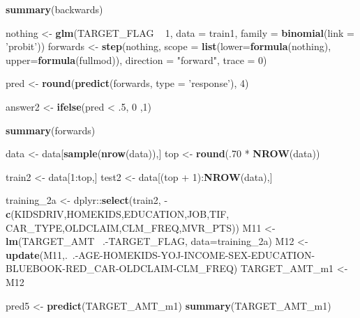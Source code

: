 \documentclass[]{article}
\newenvironment{Shaded}{\begin{snugshade}}{\end{snugshade}}
\newcommand{\KeywordTok}[1]{\textcolor[rgb]{0.13,0.29,0.53}{\textbf{{#1}}}}
\newcommand{\DataTypeTok}[1]{\textcolor[rgb]{0.13,0.29,0.53}{{#1}}}
\newcommand{\DecValTok}[1]{\textcolor[rgb]{0.00,0.00,0.81}{{#1}}}
\newcommand{\StringTok}[1]{\textcolor[rgb]{0.31,0.60,0.02}{{#1}}}
\newcommand{\NormalTok}[1]{{#1}}
\begin{document}
\begin{Shaded}
\begin{Highlighting}[]
{{{{\KeywordTok{summary}\NormalTok{(backwards)}

\NormalTok{nothing <-}\StringTok{ }\KeywordTok{glm}\NormalTok{(TARGET_FLAG ~}\StringTok{ }\DecValTok{1}\NormalTok{, }\DataTypeTok{data =} \NormalTok{train1, }\DataTypeTok{family =} \KeywordTok{binomial}\NormalTok{(}\DataTypeTok{link =} \StringTok{'probit'}\NormalTok{))}
\NormalTok{forwards <-}\StringTok{ }\KeywordTok{step}\NormalTok{(nothing, }\DataTypeTok{scope =} \KeywordTok{list}\NormalTok{(}\DataTypeTok{lower=}\KeywordTok{formula}\NormalTok{(nothing), }\DataTypeTok{upper=}\KeywordTok{formula}\NormalTok{(fullmod)), }\DataTypeTok{direction =} \StringTok{"forward"}\NormalTok{, }\DataTypeTok{trace =} \DecValTok{0}\NormalTok{)}

\NormalTok{pred <-}\StringTok{ }\KeywordTok{round}\NormalTok{(}\KeywordTok{predict}\NormalTok{(forwards, }\DataTypeTok{type =} \StringTok{'response'}\NormalTok{), }\DecValTok{4}\NormalTok{)}

\NormalTok{answer2 <-}\StringTok{ }\KeywordTok{ifelse}\NormalTok{(pred <}\StringTok{ }\NormalTok{.}\DecValTok{5}\NormalTok{, }\DecValTok{0} \NormalTok{,}\DecValTok{1}\NormalTok{)}

\KeywordTok{summary}\NormalTok{(forwards)}

\NormalTok{data <-}\StringTok{ }\NormalTok{data[}\KeywordTok{sample}\NormalTok{(}\KeywordTok{nrow}\NormalTok{(data)),]}
\NormalTok{top <-}\StringTok{ }\KeywordTok{round}\NormalTok{(.}\DecValTok{70} \NormalTok{*}\StringTok{ }\KeywordTok{NROW}\NormalTok{(data))}

\NormalTok{train2 <-}\StringTok{ }\NormalTok{data[}\DecValTok{1}\NormalTok{:top,]}
\NormalTok{test2 <-}\StringTok{ }\NormalTok{data[(top +}\StringTok{ }\DecValTok{1}\NormalTok{):}\KeywordTok{NROW}\NormalTok{(data),]}

\NormalTok{training_2a <-}\StringTok{ }\NormalTok{dplyr::}\KeywordTok{select}\NormalTok{(train2, -}\KeywordTok{c}\NormalTok{(KIDSDRIV,HOMEKIDS,EDUCATION,JOB,TIF,}
                                     \NormalTok{CAR_TYPE,OLDCLAIM,CLM_FREQ,MVR_PTS))}
\NormalTok{M11 <-}\StringTok{ }\KeywordTok{lm}\NormalTok{(TARGET_AMT~}\StringTok{ }\NormalTok{.-TARGET_FLAG, }\DataTypeTok{data=}\NormalTok{training_2a)}
\NormalTok{M12 <-}\StringTok{ }\KeywordTok{update}\NormalTok{(M11,.~.-AGE-HOMEKIDS-YOJ-INCOME-SEX-EDUCATION-BLUEBOOK-RED_CAR-OLDCLAIM-CLM_FREQ)}
\NormalTok{TARGET_AMT_m1 <-}\StringTok{ }\NormalTok{M12}

\NormalTok{pred5 <-}\StringTok{ }\KeywordTok{predict}\NormalTok{(TARGET_AMT_m1)}
\KeywordTok{summary}\NormalTok{(TARGET_AMT_m1)}

}}}}
\end{Highlighting}
\end{Shaded}
\end{document}
